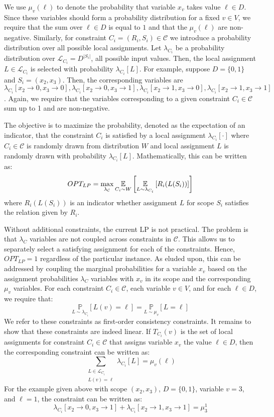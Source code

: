 We use $\mu_v(\ell)$ to denote the probability that variable $x_v$ takes value $\ell \in D$.
Since these variables should form a probability distribution for a fixed $v \in V$, we require that the sum over $\ell \in D$ is equal to $1$ and that the $\mu_v(\ell)$ are non-negative.
Similarly, for constraint $C_i = (R_i, S_i) \in \mathcal{C}$ we introduce a probability distribution over all possible local assignments.
Let $\lambda_{C_i}$ be a probability distribution over  $\mathcal{L}_{C_i} = D^{|S_i|}$, all possible input values.
Then, the local assignment $L \in \mathcal{L}_{C_i}$ is selected with probability $\lambda_{C_i}[L]$.
For example, suppose $D = \{0,1\}$ and $S_i = (x_2,x_3)$. 
Then, the corresponding variables are $\lambda_{C_i}[x_2 \rightarrow 0, x_3 \rightarrow 0], \lambda_{C_i}[x_2 \rightarrow 0, x_3 \rightarrow 1], \lambda_{C_i}[x_2 \rightarrow 1, x_3 \rightarrow 0], \lambda_{C_i}[x_2 \rightarrow 1, x_3 \rightarrow 1]$. Again, we require that the variables corresponding to a given constraint $C_i \in \mathcal{C}$ sum up to 1 and are non-negative.

The objective is to maximize the probability, denoted as the expectation of an indicator, that the constraint $C_i$ is satisfied by a local assignment $\lambda_{C_i}[\cdot]$ where $C_i \in \mathcal{C}$ is randomly drawn from distribution $W$ and local assignment $L$ is randomly drawn with probability $\lambda_{C_i}[L]$. 
Mathematically, this can be written as:
\[
	OPT_{LP} = \max_{\lambda_{\mathcal{C}}} \underset{C_i \sim W}{\mathbb{E}} \left[ \underset{L \sim \lambda_{C_i}}{\mathbb{E}} \left[ R_i( L (S_i )) \right] \right]
\]
where $R_i( L (S_i ))$ is an indicator whether assignment $L$ for scope $S_i$ satisfies the relation given by $R_i$.

Without additional constraints, the current LP is not practical. 
The problem is that $\lambda_C$ variables are not coupled across constraints in $\mathcal{C}$. 
This allows us to separately select a satisfying assignment for each of the constraints. 
Hence, $OPT_{LP} = 1$ regardless of the particular instance. 
As eluded upon, this can be addressed by coupling the marginal probabilities for a variable $x_v$ based on the assignment probabilities $\lambda_C$ variables with $x_v$ in its scope and the corresponding $\mu_v$ variables.
For each constraint $C_i \in \mathcal{C}$, each variable $v \in V$, and for each $ \ell \in D$, we require that:
\[
	\underset{L \sim \lambda_{C_i} }{\mathbb{P}}[ L(v) = \ell] = \underset{L \sim \mu_v }{\mathbb{P}}[ L = \ell]
\]
We refer to these constraints as first-order consistency constraints.
It remains to show that these constraints are indeed linear.
If $T_{C_i}(v)$ is the set of local assignments for constraint $C_i \in \mathcal{C}$ that assigns variable $x_v$  the value $\ell \in D$, then the corresponding constraint can be written as:
\[
	\sum_{\substack{L \in \mathcal{L}_{C_i}\\ L(v) = \ell}} \lambda_{C_i}[L] = \mu_v(\ell)
\]
For the example given above with scope $(x_2,x_3)$, $D = \{0,1\}$, variable $v = 3$, and $ \ell = 1$, the constraint can be written as:
\[
	\lambda_{C_i}[x_2 \rightarrow 0, x_3 \rightarrow 1] + \lambda_{C_i}[x_2 \rightarrow 1, x_3 \rightarrow 1] = \mu_3^1
\]

